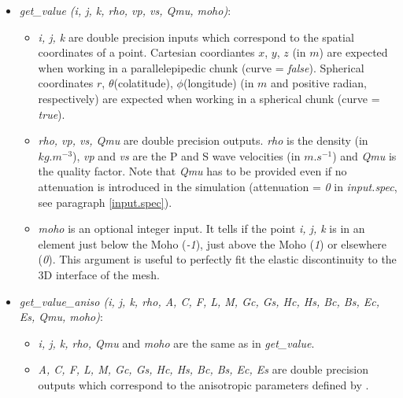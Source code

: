 \renewcommand{\labelitemii}{}
\begin{itemize}[topsep=2pt,itemsep=10pt]

\item \textit{get\_value (i, j, k, rho, vp, vs, Qmu, moho)}:

\renewcommand{\labelitemii}{}
\begin{itemize}[topsep=2pt,itemsep=4pt]

\item\textit{i, j, k} are double precision inputs which correspond to the spatial coordinates of a point.
Cartesian coordiantes $x$, $y$, $z$ (in $m$) are expected when working in a parallelepipedic chunk (curve =
\textit{false}). Spherical coordinates $r$, $\theta$(colatitude), $\phi$(longitude) (in $m$ and positive
radian, respectively) are expected when working in a spherical chunk (curve = \textit{true}).
\item\textit{rho, vp, vs, Qmu} are double precision outputs.
\textit{rho} is the density (in $kg.m^{-3}$), \textit{vp} and \textit{vs} are the P and S wave velocities (in
$m.s^{-1}$) and \textit{Qmu} is the quality factor. Note that \textit{Qmu} has to be provided even if no
attenuation is introduced in the simulation (attenuation = \textit{0} in \textit{input.spec}, see paragraph
\ref{input.spec}).
\item\textit{moho} is an optional integer input.
It tells if the point \textit{i, j, k} is in an element just below the Moho (\textit{-1}),
just above the Moho (\textit{1}) or elsewhere (\textit{0}).
This argument is useful to perfectly fit the elastic discontinuity to the 3D interface of the mesh.

\end{itemize}

\item \textit{get\_value\_aniso (i, j, k, rho, A, C, F, L, M, Gc, Gs, Hc, Hs, Bc, Bs, Ec, Es, Qmu, moho)}:

\renewcommand{\labelitemii}{}
\begin{itemize}[topsep=2pt,itemsep=4pt]

\item\textit{i, j, k, rho, Qmu} and \textit{moho} are the same as in \textit{get\_value}.
\item\textit{A, C, F, L, M, Gc, Gs, Hc, Hs, Bc, Bs, Ec, Es} are double precision outputs which correspond to the
anisotropic parameters defined by .

\end{itemize}

\end{itemize}


